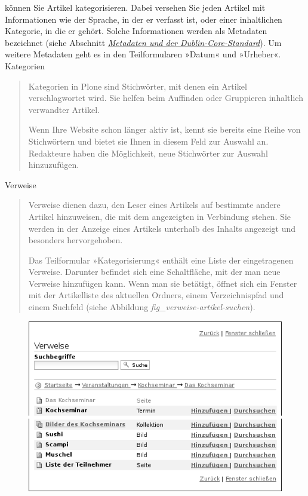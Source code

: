 \documentclass[a4paper,12pt,ngerman]{manual}
\begin{document}
können Sie Artikel kategorisieren. Dabei versehen Sie jeden Artikel mit
Informationen wie der Sprache, in der er verfasst ist, oder einer inhaltlichen
Kategorie, in die er gehört. Solche Informationen werden als Metadaten
bezeichnet (siehe Abschnitt \hyperlink{sec-exkurs-metadaten}{\emph{Metadaten und der Dublin-Core-Standard}}). Um weitere
Metadaten geht es in den Teilformularen »Datum« und »Urheber«.
\hypertarget{sec-teilf-kateg-1}{}
Kategorien
\begin{quote}

Kategorien in Plone sind Stichwörter, mit denen ein Artikel verschlagwortet
wird. Sie helfen beim Auffinden oder Gruppieren inhaltlich verwandter
Artikel.

Wenn Ihre Website schon länger aktiv ist, kennt sie bereits eine Reihe von
Stichwörtern und bietet sie Ihnen in diesem Feld zur Auswahl an. Redakteure
haben die Möglichkeit, neue Stichwörter zur Auswahl hinzuzufügen.
\end{quote}
\hypertarget{sec-teilf-kateg-2}{}
Verweise
\begin{quote}

Verweise dienen dazu, den Leser eines Artikels auf bestimmte andere Artikel
hinzuweisen, die mit dem angezeigten in Verbindung stehen. Sie werden in der
Anzeige eines Artikels unterhalb des Inhalts angezeigt und besonders
hervorgehoben.

Das Teilformular »Kategorisierung« enthält eine Liste der eingetragenen
Verweise. Darunter befindet sich eine Schaltfläche, mit der man neue Verweise
hinzufügen kann. Wenn man sie betätigt, öffnet sich ein Fenster mit der
Artikelliste des aktuellen Ordners, einem Verzeichnispfad und einem Suchfeld
(siehe Abbildung \emph{fig\_verweise-artikel-suchen}).
\end{quote}
\hypertarget{fig-verweise-artikel-suchen}{}\begin{figure}[htbp]
\centering

\includegraphics{verweise-artikel-suchen.png}
\end{figure}
\end{document}
